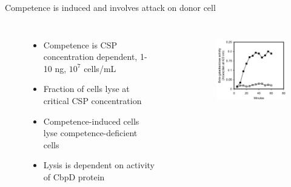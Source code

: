 \documentclass{beamer}
\begin{document}
\begin{frame}{Competence is induced and involves attack on donor cell}
\begin{columns}[c] %
\begin{figure}
\begin{itemize}
\item Competence is CSP concentration dependent, 1-10 ng, $10^{7}$ cells/mL
\item Fraction of cells lyse at critical CSP concentration
\item Competence-induced cells lyse competence-deficient cells 
\item Lysis is dependent on activity of CbpD protein
\end{itemize}
\end{figure}
\begin{figure}
\includegraphics[width=0.6\linewidth]{images/beta-g-vs-time.png}\\
\hspace*{11pt}\hbox{\scriptsize {}}\\

\end{figure}
\end{columns}
\end{frame}
\end{document}

